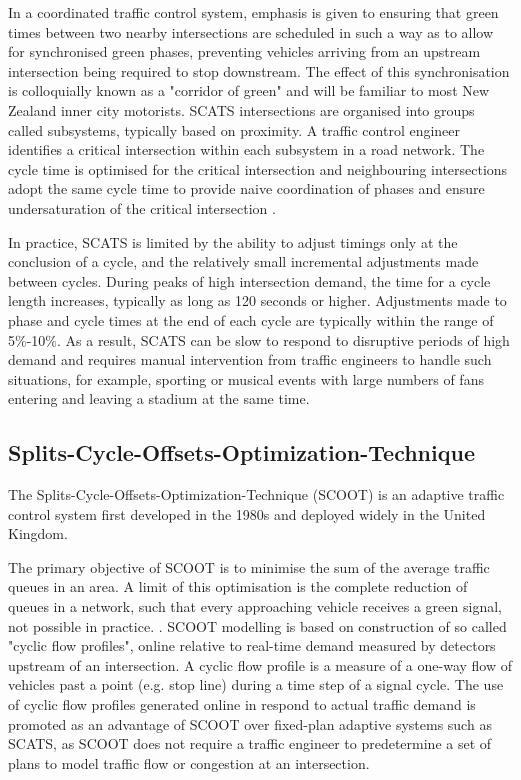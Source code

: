 In a coordinated traffic control system, emphasis is given to ensuring that green times between two nearby intersections are scheduled in such a way as to allow for synchronised green phases, preventing vehicles arriving from an upstream intersection being required to stop downstream. The effect of this synchronisation is colloquially known as a "corridor of green" and will be familiar to most New Zealand inner city motorists. SCATS intersections are organised into groups called subsystems, typically based on proximity. A traffic control engineer identifies a critical intersection within each subsystem in a road network. The cycle time is optimised for the critical intersection and neighbouring intersections adopt the same cycle time to provide naive coordination of phases and ensure undersaturation of the critical intersection \cite{kilby2010rta}.

In practice, SCATS is limited by the ability to adjust timings only at the conclusion of a cycle, and the relatively small incremental adjustments made between cycles. During peaks of high intersection demand, the time for a cycle length increases, typically as long as 120 seconds or higher. Adjustments made to phase and cycle times at the end of each cycle are typically within the range of 5\%-10\%. As a result, SCATS can be slow to respond to disruptive periods of high demand and requires manual intervention from traffic engineers to handle such situations, for example, sporting or musical events with large numbers of fans entering and leaving a stadium at the same time. 

\subsection{Splits-Cycle-Offsets-Optimization-Technique}

The Splits-Cycle-Offsets-Optimization-Technique (SCOOT) is an adaptive traffic control system first developed in the 1980s and deployed widely in the United Kingdom. %

The primary objective of SCOOT is to minimise the sum of the average traffic queues in an area. A limit of this optimisation is the complete reduction of queues in a network, such that every approaching vehicle receives a green signal, not possible in practice. \cite{bell1992future,robertson1991optimizing}. SCOOT modelling is based on construction of so called "cyclic flow profiles", online relative to real-time demand measured by detectors upstream of an intersection. A cyclic flow profile is a measure of a one-way flow of vehicles past a point (e.g. stop line) during a time step of a signal cycle. The use of cyclic flow profiles generated online in respond to actual traffic demand is promoted as an advantage of SCOOT over fixed-plan adaptive systems such as SCATS, as SCOOT does not require a traffic engineer to predetermine a set of plans to model traffic flow or congestion at an intersection.

